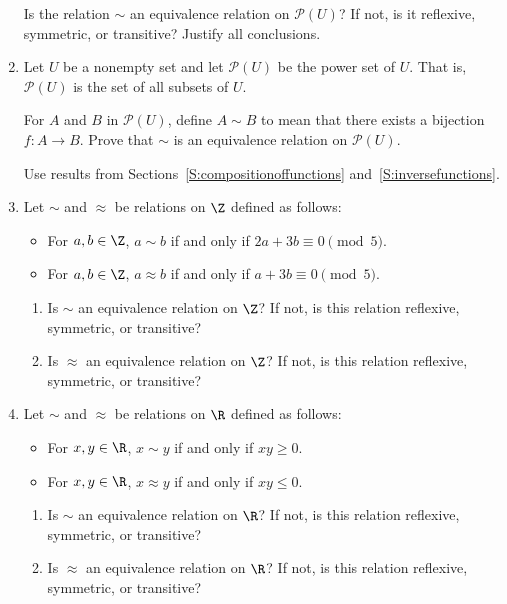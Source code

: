 \begin{enumerate}
\noindent
Is the relation  $\sim$  an equivalence relation on  $\mathcal{P}( U )$?  If not, is it reflexive, symmetric, or transitive?  Justify all conclusions.



\item Let $U$ be a nonempty set and let $\mathcal{P} ( U )$ be the power set of $U$.  That is, 
$\mathcal{P} \left( U \right)$ is the set of all subsets of $U$. 
\label{exer:sec72-powerset}

For $A$ and $B$ in $\mathcal{P} ( U )$, define $A \sim B$ to mean that there exists a bijection 
$f:A \to B$.  Prove that $\sim$ is an equivalence relation on 
$\mathcal{P} ( U )$.

\hint  Use results from Sections~\ref{S:compositionoffunctions} 
and~\ref{S:inversefunctions}.


\item Let $\sim$ and $\approx$ be relations on $\Z$ defined as follows: 
\label{exer:modequivrel}

\begin{itemize}
\item For $a, b \in \Z$, $a \sim b$ if and only if $2a + 3b \equiv 0 \pmod 5$.
\item For $a, b \in \Z$, $a \approx b$ if and only if $a + 3b \equiv 0 \pmod 5$.
\end{itemize}

\begin{enumerate}
\item Is $\sim$ an equivalence relation on $\Z$?  If not, is this relation reflexive, symmetric, or transitive?
\item Is $\approx$ an equivalence relation on $\Z$?  If not, is this relation reflexive, symmetric, or transitive?
\end{enumerate}

\item Let $\sim$ and $\approx$ be relations on $\R$ defined as follows: \label{exer72-signed}

\begin{itemize}
\item For $x, y \in \R$, $x \sim y$ if and only if $xy \geq 0$.
\item For $x, y \in \R$, $x \approx y$ if and only if $xy \leq 0$.
\end{itemize}

\begin{enumerate}
\item Is $\sim$ an equivalence relation on $\R$?  If not, is this relation reflexive, symmetric, or transitive?
\item Is $\approx$ an equivalence relation on $\R$?  If not, is this relation reflexive, symmetric, or transitive?
\end{enumerate}


\end{enumerate}
